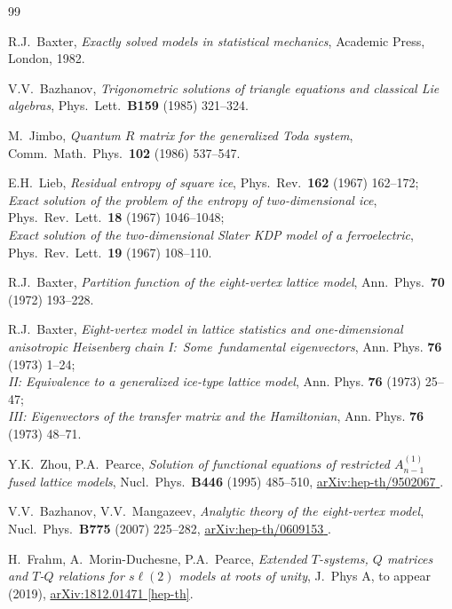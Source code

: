\documentclass[11pt]{article}
\numberwithin{equation}{section}
\theoremstyle{plain}
\numberwithin{equation}{section}
\def\arxiv#1#2{\href{http://arxiv.org/abs/#1}{\textsf{arXiv:#1 #2}}}
\begin{document}
\begin{thebibliography}{99}

R.J.~Baxter, 
{\em Exactly solved models in statistical mechanics}, 
Academic Press, London, 1982.

V.V.~Bazhanov,
{\em Trigonometric solutions of triangle equations and classical Lie algebras},
Phys.~Lett.~{\bf B159} (1985) 321--324.
	
M.~Jimbo,
{\em Quantum $R$ matrix for the generalized Toda system},
Comm.~Math.~Phys.~{\bf 102} (1986) 537--547.

E.H.~Lieb,
{\em Residual entropy of square ice},
Phys.~Rev.~{\bf 162} (1967) 162--172;\\
{\em Exact solution of the problem of the entropy of two-dimensional ice},
Phys.~Rev.~Lett.~{\bf 18} (1967) 1046--1048;\\
{\em Exact solution of the two-dimensional Slater KDP model of a ferroelectric},
Phys.~Rev.~Lett.~{\bf 19} (1967) 108--110.

R.J.~Baxter,
{\em Partition function of the eight-vertex lattice model}, 
Ann.~Phys.~{\bf 70} (1972) 193--228.

R.J.~Baxter, 
{\em Eight-vertex model in lattice statistics and one-dimensional anisotropic Heisenberg chain 
I:~Some~fundamental eigenvectors}, Ann. Phys. {\bf 76} (1973) 1--24;\\
{\em II: Equivalence to a generalized ice-type lattice model}, Ann. Phys. {\bf 76} (1973) 25--47;\\
{\em III: Eigenvectors of the transfer matrix and the Hamiltonian}, Ann. Phys. {\bf 76} (1973) 48--71.

Y.K.~Zhou, P.A.~Pearce,
{\em Solution of functional equations of restricted $A_{n-1}^{(1)}$ fused lattice models},
Nucl.~Phys.~{\bf B446} (1995) 485--510,
\arxiv{hep-th/9502067}{\!\!}.

	V.V.~Bazhanov, V.V.~Mangazeev, 
	{\em Analytic theory of the eight-vertex model}, 
	Nucl.~Phys.~{\bf \!B775} (2007) 225--282,
	\arxiv{hep-th/0609153}{\!\!}.

 H.~Frahm, A.~Morin-Duchesne, P.A.~Pearce, 
 {\em Extended $T$-systems, $Q$ matrices and $T$-$Q$ relations for $s\ell(2)$ models at roots of unity}, 
J.~Phys A, to appear (2019), \arxiv{1812.01471}{[hep-th]}.


\end{thebibliography}
\end{document}
